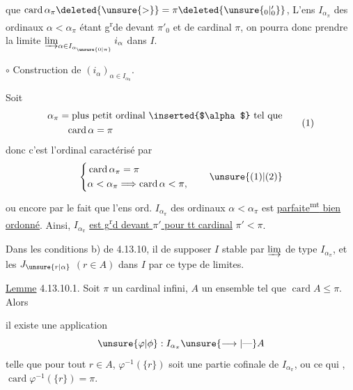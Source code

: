 que $\operatorname{card}\alpha_\pi\deleted{\unsure{>}}=\pi\deleted{\unsure{{}_0|{}'_0}}$,
L'ens  $I_{\alpha_\pi}$ des
ordinaux $\alpha<\alpha_\pi$ étant g\textsuperscript{r}de devant $\pi'_0$
et de cardinal \deleted{$\unsure{\leq}$} $\pi$, on pourra donc
prendre la limite $\varinjlim_{\alpha\in I_{\alpha_{\unsure{0|\pi}}}}i_\alpha$ dans $I$.

$\circ$ Construction de $(i_\alpha)_{\alpha\in I_{\alpha_0}}$.

 Soit
\[
\begin{aligned}
\alpha_\pi&=\text{plus petit ordinal \inserted{$\alpha$} tel que}\\
&\phantom{=}\operatorname{card}\alpha=\pi
\end{aligned}\tag*{(1)}
\]
donc c'est l'ordinal caractérisé par
\[
\left\{\begin{aligned}
&\operatorname{card}\alpha_\pi=\pi\\
&\alpha<\alpha_\pi\Longrightarrow\operatorname{card}\alpha<\pi,
\end{aligned}\right.\tag*{\unsure{(1)|(2)}}
\]
ou encore par le fait que l'ens ord.
$I_{\alpha_\pi}$ des ordinaux $\alpha<\alpha_\pi$ est \uline{parfaite\textsuperscript{mt}
bien ordonné}.  Ainsi, $I_{\alpha_\pi}$ \uline{est
g\textsuperscript{r}d devant $\pi'$ pour tt cardinal} $\pi'<\pi$.

Dans les conditions b)  de 4.13.10, il 
de supposer $I$ stable par $\varinjlim$ de
type $I_{\alpha_\pi}$, et les $J_{\unsure{r|\alpha}}$ $(r\in A)$
 dans $I$ par ce type de limites.

 \uline{Lemme} 4.13.10.1. Soit $\pi$ un cardinal infini,
$A$ un ensemble  tel que $\operatorname{card}A\leq\pi$. Alors

il existe une application
\[
\unsure{\varphi|\phi}:I_{\alpha_\pi}\unsure{\longrightarrow|\text{---}}A
\]
telle que pour tout $r\in A$, $\varphi^{-1}(\{r\})$ soit
une partie cofinale de $I_{\alpha_\pi}$, ou ce
qui ,
$\operatorname{card}\varphi^{-1}(\{r\})=\pi$.

